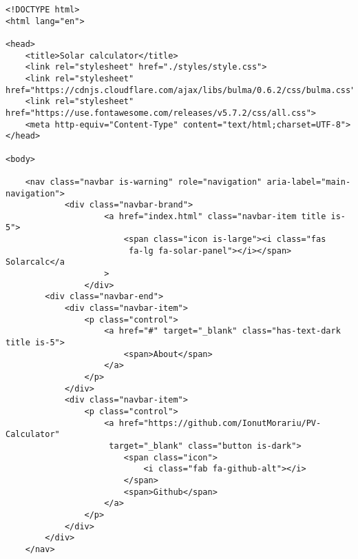 \begin{lstlisting}[style=ES6, caption={public/index.html}]
<!DOCTYPE html>
<html lang="en">

<head>
    <title>Solar calculator</title>
    <link rel="stylesheet" href="./styles/style.css">
    <link rel="stylesheet" href="https://cdnjs.cloudflare.com/ajax/libs/bulma/0.6.2/css/bulma.css">
    <link rel="stylesheet" href="https://use.fontawesome.com/releases/v5.7.2/css/all.css">
    <meta http-equiv="Content-Type" content="text/html;charset=UTF-8">
</head>

<body>

    <nav class="navbar is-warning" role="navigation" aria-label="main-navigation">
			<div class="navbar-brand">
                    <a href="index.html" class="navbar-item title is-5">
                        <span class="icon is-large"><i class="fas
                         fa-lg fa-solar-panel"></i></span> Solarcalc</a
                    >
                </div>
        <div class="navbar-end">
            <div class="navbar-item">
                <p class="control">
                    <a href="#" target="_blank" class="has-text-dark title is-5">
                        <span>About</span>
                    </a>
                </p>
            </div>
            <div class="navbar-item">
                <p class="control">
                    <a href="https://github.com/IonutMorariu/PV-Calculator"
                     target="_blank" class="button is-dark">
                        <span class="icon">
                            <i class="fab fa-github-alt"></i>
                        </span>
                        <span>Github</span>
                    </a>
                </p>
            </div>
        </div>
    </nav>


\end{lstlisting}

